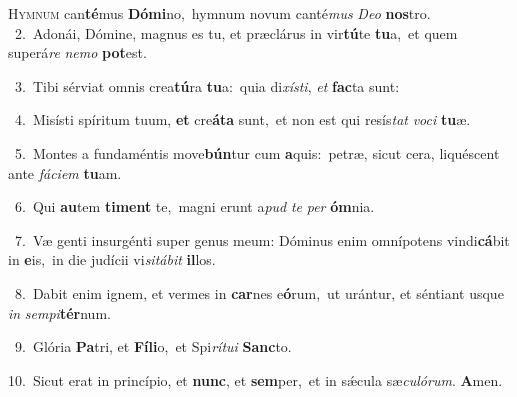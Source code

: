 \lettrine{\initial\textcolor{\initialcolor}{H}}{ymnum} can\-\textbf{té}\-mus \textbf{Dó}\-\textbf{mi}no,~\star hymnum novum canté\textit{mus} \textit{De}\-\textit{o} \textbf{nos}\-tro.\\
{\numbfont\textcolor{\numbcolor}{~2.}}~Adonái, Dómine, magnus es tu, et præclárus in vir\-\textbf{tú}\-te \textbf{tu}\-a,~\star et quem superá\textit{re} \textit{ne}\-\textit{mo} \textbf{pot}\-est.\par
{\numbfont\textcolor{\numbcolor}{~3.}}~Tibi sérviat omnis crea\-\textbf{tú}\-ra \textbf{tu}\-a:~\star quia di\-\textit{xís}\-\textit{ti}, \textit{et} \textbf{fac}\-ta sunt:\par
{\numbfont\textcolor{\numbcolor}{~4.}}~Misísti spíritum tuum, \textbf{et} cre\-\textbf{á}\-\textbf{ta} sunt,~\star et non est qui resís\textit{tat} \textit{vo}\-\textit{ci} \textbf{tu}\-æ.\par
{\numbfont\textcolor{\numbcolor}{~5.}}~Montes a fundaméntis move\-\textbf{bún}\-tur cum \textbf{a}\-quis:~\star petræ, sicut cera, liquéscent ante \textit{fá}\-\textit{ci}\textit{em} \textbf{tu}\-am.\par
{\numbfont\textcolor{\numbcolor}{~6.}}~Qui \textbf{au}\-tem \textbf{ti}\-\textbf{ment} te,~\star magni erunt a\textit{pud} \textit{te} \textit{per} \textbf{óm}\-nia.\par
{\numbfont\textcolor{\numbcolor}{~7.}}~Væ genti insurgénti super genus meum: Dóminus enim omnípotens vindi\-\textbf{cá}\-bit in \textbf{e}\-is,~\star in die judícii vi\-\textit{si}\-\textit{tá}\textit{bit} \textbf{il}\-los.\par
{\numbfont\textcolor{\numbcolor}{~8.}}~Dabit enim ignem, et vermes in \textbf{car}\-nes e\-\textbf{ó}\-rum,~\star ut urántur, et séntiant usque \textit{in} \textit{sem}\-\textit{pi}\textbf{tér}num.\par
{\numbfont\textcolor{\numbcolor}{~9.}}~Glória \textbf{Pa}\-tri, et \textbf{Fí}\-\textbf{li}o,~\star et Spi\-\textit{rí}\-\textit{tu}\textit{i} \textbf{Sanc}\-to.\par
{\numbfont\textcolor{\numbcolor}{10.}}~Sicut erat in princípio, et \textbf{nunc}\-, et \textbf{sem}\-per,~\star et in sǽcula sæ\-\textit{cu}\-\textit{ló}\textit{rum}. \textbf{A}\-men.\par
